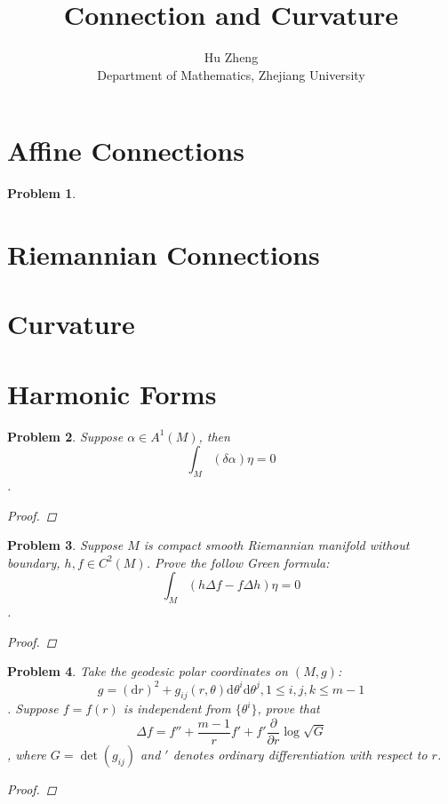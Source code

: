 \documentclass[11pt]{article}
\title{Connection and Curvature}
\author{Hu Zheng \\ Department of Mathematics, Zhejiang University}
\newcommand{\dd}{\mathrm{d}}
\newcommand{\pd}{\partial}
\newtheorem{problem}{Problem}
\numberwithin{problem}{section}
\begin{document}
\maketitle
\tableofcontents

\section{Affine Connections}

\begin{problem}

\end{problem}

\section{Riemannian Connections}

\section{Curvature}

\section{Harmonic Forms}

\begin{problem}
Suppose $\alpha \in A^1(M)$, then $$\int_M(\delta\alpha)\eta = 0$$.
\begin{proof}

\end{proof}

\end{problem}

\begin{problem}
Suppose $M$ is compact smooth Riemannian manifold without boundary, $h,f\in C^2(M)$. Prove the follow Green formula:
$$\int_M(h\Delta f-f\Delta h)\eta = 0$$.
\begin{proof}

\end{proof}

\end{problem}

\begin{problem}
Take the geodesic polar coordinates on $(M,g)$:
$$g = (\dd r)^2+g_{ij}(r,\theta)\dd \theta^i\dd \theta^j, 1 \le i,j,k \le m-1$$.
Suppose $f=f(r)$ is independent from $\{\theta^i\}$, prove that
$$\Delta f = f''+\dfrac{m-1}{r}f' + f'\dfrac{\pd}{\pd r}\log \sqrt{G}$$,
where $G=\det(g_{ij})$ and $'$ denotes ordinary differentiation with respect to $r$.
\begin{proof}

\end{proof}

\end{problem}
\end{document}
